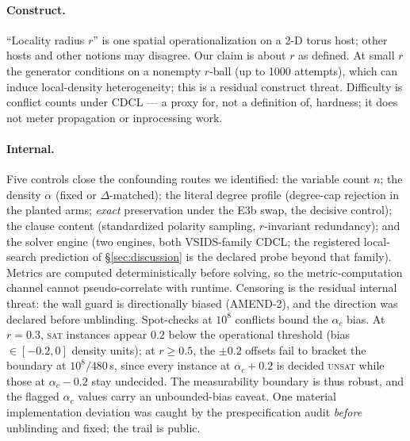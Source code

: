 \documentclass[pdflatex,sn-basic,Numbered]{sn-jnl}
\begin{document}
\paragraph{Construct.}
``Locality radius $r$'' is one spatial operationalization on a 2-D torus host;
other hosts and other notions may disagree. Our claim is about $r$ as defined.
At small $r$ the generator conditions on a nonempty $r$-ball (up to 1000
attempts), which can induce local-density heterogeneity; this is a residual
construct threat. Difficulty is conflict counts under CDCL --- a proxy for,
not a definition of, hardness; it does not meter propagation or inprocessing
work.

\paragraph{Internal.}
Five controls close the confounding routes we identified: the variable count
$n$; the density $\alpha$ (fixed or $\Delta$-matched); the literal degree
profile (degree-cap rejection in the planted arms; \emph{exact} preservation
under the E3b swap, the decisive control); the clause content (standardized
polarity sampling, $r$-invariant redundancy); and the solver engine (two
engines, both VSIDS-family CDCL; the registered local-search prediction of
\S\ref{sec:discussion} is the declared probe beyond that family). Metrics are computed deterministically before solving, so the
metric-computation channel cannot pseudo-correlate with runtime. Censoring is
the residual internal threat: the wall guard is directionally biased
(AMEND-2), and the direction was declared before unblinding. Spot-checks at
$10^8$ conflicts bound the $\alpha_c$ bias. At $r=0.3$, \textsc{sat}
instances appear $0.2$ below the operational threshold (bias $\in[-0.2,0]$
density units); at $r\ge0.5$, the $\pm0.2$ offsets fail to bracket the
boundary at $10^8/480$\,s, since every instance at $\alpha_c+0.2$ is decided
\textsc{unsat} while those at $\alpha_c-0.2$ stay undecided. The
measurability boundary is thus robust, and the flagged $\alpha_c$ values
carry an unbounded-bias caveat.
One material implementation
deviation was caught by the prespecification audit \emph{before} unblinding
and fixed; the trail is public.
\end{document}
